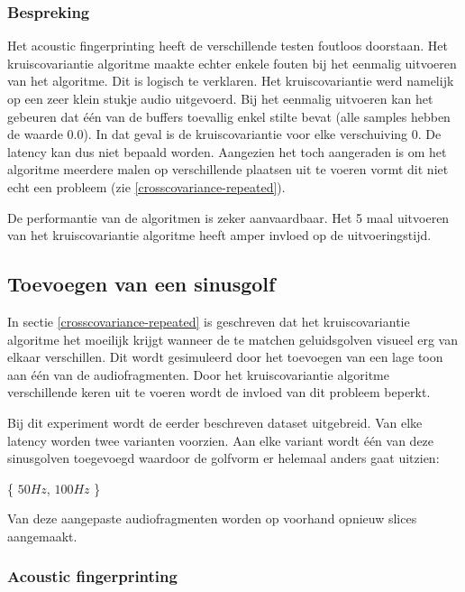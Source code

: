 \subsubsection{Bespreking}

Het acoustic fingerprinting heeft de verschillende testen foutloos doorstaan. Het kruiscovariantie algoritme maakte echter enkele fouten bij het eenmalig uitvoeren van het algoritme. Dit is logisch te verklaren. Het kruiscovariantie werd namelijk op een zeer klein stukje audio uitgevoerd. Bij het eenmalig uitvoeren kan het gebeuren dat één van de buffers toevallig enkel stilte bevat (alle samples hebben de waarde 0.0). In dat geval is de kruiscovariantie voor elke verschuiving 0. De latency kan dus niet bepaald worden. Aangezien het toch aangeraden is om het algoritme meerdere malen op verschillende plaatsen uit te voeren vormt dit niet echt een probleem (zie \ref{crosscovariance-repeated}).

De performantie van de algoritmen is zeker aanvaardbaar. Het 5 maal uitvoeren van het kruiscovariantie algoritme heeft amper invloed op de uitvoeringstijd.

\subsection{Toevoegen van een sinusgolf}
\label{sine-test}

In sectie \ref{crosscovariance-repeated} is geschreven dat het kruiscovariantie algoritme het moeilijk krijgt wanneer de te matchen geluidsgolven visueel erg van elkaar verschillen. Dit wordt gesimuleerd door het toevoegen van een lage toon aan één van de audiofragmenten. Door het kruiscovariantie algoritme verschillende keren uit te voeren wordt de invloed van dit probleem beperkt.

Bij dit experiment wordt de eerder beschreven dataset uitgebreid. Van elke latency worden twee varianten voorzien. Aan elke variant wordt één van deze sinusgolven toegevoegd waardoor de golfvorm er helemaal anders gaat uitzien:

\begin{center}
	\{ $50Hz$, $100Hz$ \}
\end{center}

Van deze aangepaste audiofragmenten worden op voorhand opnieuw slices aangemaakt. 

\subsubsection{Acoustic fingerprinting}

